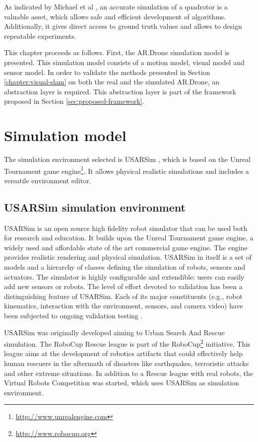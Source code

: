 As indicated by Michael et al \cite{Michael2010ra}, an accurate simulation of a quadrotor is a valuable asset, which allows safe and efficient development of %
algorithms. Additionally, it gives direct access to ground truth values and allows to design repeatable experiments.

This chapter proceeds as follows.
First, the AR.Drone simulation model is presented.
This simulation model consists of a motion model, visual model and sensor model.
In order to validate the methods presented in Section \ref{chapter:visual-slam} on both the real and the simulated AR.Drone, an abstraction layer is required.
This abstraction layer is part of the framework proposed in Section \ref{sec:proposed-framework}.

	\section{Simulation model}
The simulation environment selected is USARSim \cite{Balakirsky2009iros,carpin2007usarsim}, which is based on the Unreal Tournament game engine\footnote{\url{http://www.unrealengine.com}}.
It allows physical realistic simulations and includes a versatile environment editor.

		\subsection{USARSim simulation environment}
USARSim is an open source high fidelity robot simulator that can be used both for research and education.
It builds upon the Unreal Tournament game engine, a widely used and affordable state of the art commercial game engine.
The engine provides realistic rendering and physical simulation.
USARSim in itself is a set of models and a hierarchy of classes defining the simulation of robots, sensors and actuators.
The simulator is highly configurable and extendible: users can easily add new sensors or robots.
The level of effort devoted to validation has been a distinguishing feature of USARSim.
Each of its major constituents (e.g., robot kinematics, interaction with the environment, sensors, and camera video) have been subjected to ongoing validation testing \cite{formsma2011realistic,carpin2006high,wang2005validating,carpin2007bridging,carpin2006quantitative}.

USARSim was originally developed aiming to Urban Search And Rescue simulation.
The RoboCup Rescue league is part of the RoboCup\footnote{\url{http://www.robocup.org}} initiative.
This league aims at the development of robotics artifacts that could effectively help human rescuers in the aftermath of disasters like earthquakes, terroristic attacks and other extreme situations.
In addition to a Rescue league with real robots, the Virtual Robots Competition was started, which uses USARSim as simulation environment.

